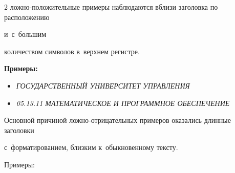 \begin{multicols}{2}
лож\-но-по\-ло\-жи\-тель\-ные примеры наблюдаются вбли\-зи заголовка по расположению 


и~с~большим 


количеством символов в~верхнем ре\-гистре.





\textbf{Примеры:}





\begin{itemize}


\item[$\bullet$]


\textit{ГОСУДАРСТВЕННЫЙ УНИВЕРСИТЕТ УПРАВ\-ЛЕ\-НИЯ}





\item[$\bullet$]


\textit{05.13.11 МАТЕМАТИЧЕСКОЕ И ПРО\-ГРАМ\-МНОЕ ОБЕСПЕЧЕНИЕ}


\end{itemize}





Основной причиной лож\-но-от\-ри\-ца\-тель\-ных примеров оказались длинные заголовки 


с~форматированием, близким к~обыкновенному тексту. 


Примеры:





\end{multicols}

